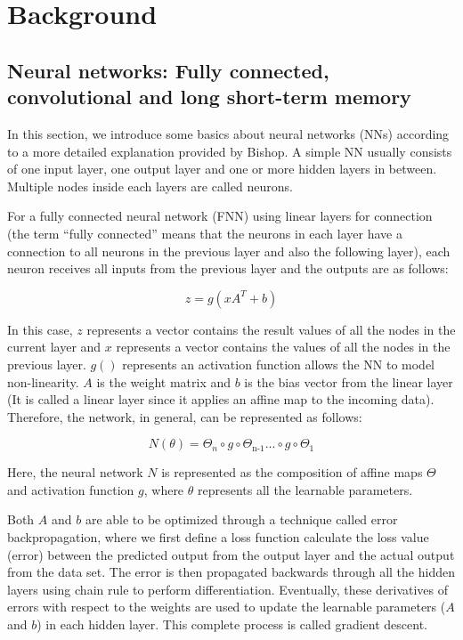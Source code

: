 \chapter{Background}\label{chap:background}


\section{Neural networks: Fully connected, convolutional and long short-term memory}

In this section, we introduce some basics about neural networks (NNs) according to a more detailed explanation provided by Bishop. \citep{10.1117_1.2819119} A simple NN usually consists of one input layer, one output layer and one or more hidden layers in between. Multiple nodes inside each layers are called neurons. 

For a fully connected neural network (FNN) using linear layers for connection (the term “fully connected” means that the neurons in each layer have a connection to all neurons in the previous layer and also the following layer), each neuron receives all inputs from the previous layer and the outputs are as follows:

\begin{equation}
z = g(xA^{T} + b)
\end{equation}

In this case, $z$ represents a vector contains the result values of all the nodes in the current layer and $x$ represents a vector contains the values of all the nodes in the previous layer. $g()$ represents an activation function allows the NN to model non-linearity. $A$ is the weight matrix and $b$ is the bias vector from the linear layer (It is called a linear layer since it applies an affine map to the incoming data). Therefore, the network, in general, can be represented as follows:

\begin{equation}
N(\theta) = \Theta_n \circ g \circ \Theta_\text{n-1} ... \circ g \circ \Theta_1
\end{equation}

Here, the neural network $N$ is represented as the composition of affine maps $\Theta$ and activation function $g$, where $\theta$ represents all the learnable parameters.

Both $A$ and $b$ are able to be optimized through a technique called error backpropagation, where we first define a loss function calculate the loss value (error) between the predicted output from the output layer and the actual output from the data set. The error is then propagated backwards through all the hidden layers using chain rule to perform differentiation. Eventually, these derivatives of errors with respect to the weights are used to update the learnable parameters ($A$ and $b$) in each hidden layer. This complete process is called gradient descent. 

